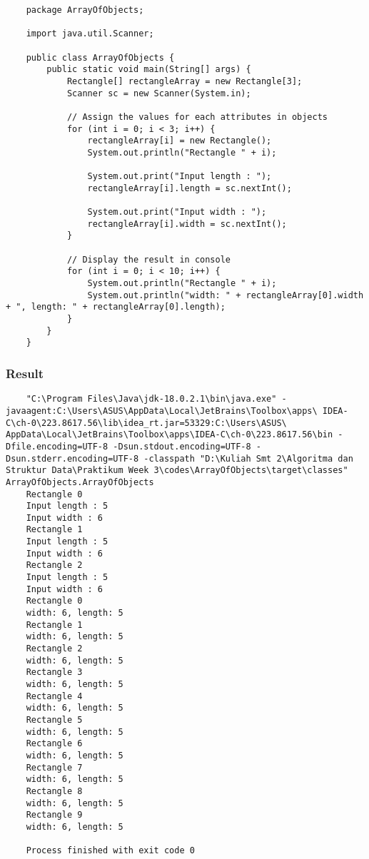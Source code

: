 \documentclass[12pt,titlepage]{article}
\begin{document}
\begin{verbatim}
    package ArrayOfObjects;

    import java.util.Scanner;

    public class ArrayOfObjects {
        public static void main(String[] args) {
            Rectangle[] rectangleArray = new Rectangle[3];
            Scanner sc = new Scanner(System.in);

            // Assign the values for each attributes in objects
            for (int i = 0; i < 3; i++) {
                rectangleArray[i] = new Rectangle();
                System.out.println("Rectangle " + i);

                System.out.print("Input length : ");
                rectangleArray[i].length = sc.nextInt();

                System.out.print("Input width : ");
                rectangleArray[i].width = sc.nextInt();
            }

            // Display the result in console
            for (int i = 0; i < 10; i++) {
                System.out.println("Rectangle " + i);
                System.out.println("width: " + rectangleArray[0].width + ", length: " + rectangleArray[0].length);
            }
        }
    }
\end{verbatim}

\subsubsection{Result}

\newpage
\begin{verbatim}
    "C:\Program Files\Java\jdk-18.0.2.1\bin\java.exe" - javaagent:C:\Users\ASUS\AppData\Local\JetBrains\Toolbox\apps\ IDEA-C\ch-0\223.8617.56\lib\idea_rt.jar=53329:C:\Users\ASUS\ AppData\Local\JetBrains\Toolbox\apps\IDEA-C\ch-0\223.8617.56\bin -Dfile.encoding=UTF-8 -Dsun.stdout.encoding=UTF-8 -Dsun.stderr.encoding=UTF-8 -classpath "D:\Kuliah Smt 2\Algoritma dan Struktur Data\Praktikum Week 3\codes\ArrayOfObjects\target\classes" ArrayOfObjects.ArrayOfObjects
    Rectangle 0
    Input length : 5
    Input width : 6
    Rectangle 1
    Input length : 5
    Input width : 6
    Rectangle 2
    Input length : 5
    Input width : 6
    Rectangle 0
    width: 6, length: 5
    Rectangle 1
    width: 6, length: 5
    Rectangle 2
    width: 6, length: 5
    Rectangle 3
    width: 6, length: 5
    Rectangle 4
    width: 6, length: 5
    Rectangle 5
    width: 6, length: 5
    Rectangle 6
    width: 6, length: 5
    Rectangle 7
    width: 6, length: 5
    Rectangle 8
    width: 6, length: 5
    Rectangle 9
    width: 6, length: 5

    Process finished with exit code 0

\end{verbatim}
\end{document}
